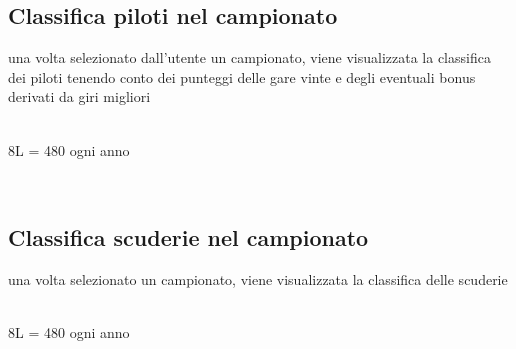 \documentclass[a4paper,12pt]{report}
\begin{document}
			\subsection{Classifica piloti nel campionato}
			una volta selezionato dall'utente un campionato, viene visualizzata la classifica dei piloti
			tenendo conto dei punteggi delle gare vinte e degli eventuali bonus derivati da giri migliori
			\begin{table}[!htb]
				\centering
				\begin{center}
				\newline\\
				8L = 480 ogni anno\\
				\end{center}
			\end{table}\\
			\subsection{Classifica scuderie nel campionato}
			una volta selezionato un campionato, viene visualizzata la classifica delle scuderie
			\begin{table}[!htb]
				\centering
				\begin{center}
				\newline\\
				8L = 480 ogni anno\\
				\end{center}
			\end{table}\\
\end{document}
